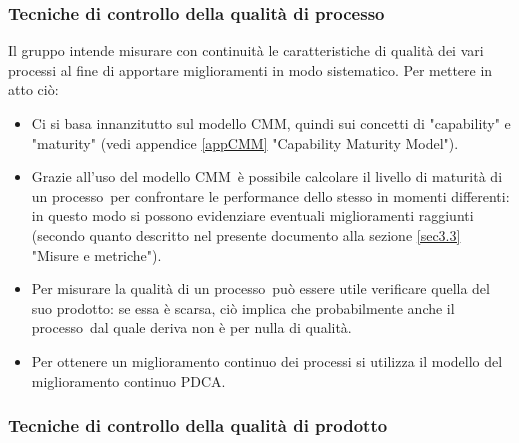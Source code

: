 \documentclass[../PianoDiQualifica.tex]{subfiles}
\begin{document}
			\subsubsection{Tecniche di controllo della qualità di processo}
			Il gruppo intende misurare con continuità le caratteristiche di qualità dei vari processi al fine di apportare miglioramenti in modo sistematico. Per mettere in atto ciò:
			\begin{itemize}
				\item Ci si basa innanzitutto sul modello CMM\g, quindi sui concetti di "capability" e "maturity" (vedi appendice \ref{appCMM} "Capability Maturity Model").
				\item Grazie all'uso del modello CMM\g\ è possibile calcolare il livello di maturità di un processo\g\ per confrontare le performance dello stesso in momenti differenti: in questo modo si possono evidenziare eventuali miglioramenti raggiunti (secondo quanto descritto nel presente documento alla sezione \ref{sec3.3} "Misure e metriche").
				\item Per misurare la qualità di un processo\g\ può essere utile verificare quella del suo prodotto\g: se essa è scarsa, ciò implica che probabilmente anche il processo\g\ 
dal quale deriva non è per nulla di qualità.
				\item Per ottenere un miglioramento continuo dei processi si utilizza il modello del miglioramento continuo PDCA\g.
			\end{itemize}
			\subsubsection{Tecniche di controllo della qualità di prodotto}
\end{document}
